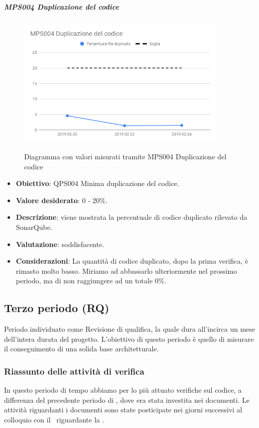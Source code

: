     \subparagraph{MPS004 Duplicazione del codice}

    \begin{figure}[H]
        \centering
        \includegraphics[width=0.9\textwidth]{img/cruscotti/RP/MPS004.png}
        \label{immaginePresenzaDupplicazioneCodiceRP}
        \caption{Diagramma con valori misurati tramite MPS004 Duplicazione del codice}
    \end{figure}

    \begin{itemize}
        \item \textbf{Obiettivo}: QPS004 Minima duplicazione del codice.
        \item \textbf{Valore desiderato}: 0 - 20\%.
        \item \textbf{Descrizione}: viene mostrata la percentuale di codice duplicato rilevato da SonarQube.
        \item \textbf{Valutazione}: soddisfacente.
        \item \textbf{Considerazioni}: La quantità di codice duplicato, dopo la prima verifica, è rimasto molto basso. Miriamo ad abbassarlo ulteriormente nel prossimo periodo, ma di non raggiungere ad un totale 0\%.
    \end{itemize}

	\subsection{Terzo periodo (RQ)}\label{TerzoPeridodoRQ}
	Periodo individuato come Revisione di qualifica, la quale dura all'incirca un mese dell'intera durata
	del progetto. L'obiettivo di questo periodo è quello di misurare il conseguimento di una solida base
	architetturale.

	\subsubsection{Riassunto delle attività di verifica}
	In questo periodo di tempo abbiamo per lo più attuato verifiche sul codice, a differenza del precedente
	periodo di \RP, dove era stata investita nei documenti. Le attività riguardanti i documenti sono state posticipate nei giorni successivi al colloquio con il \RC\ riguardante la .

